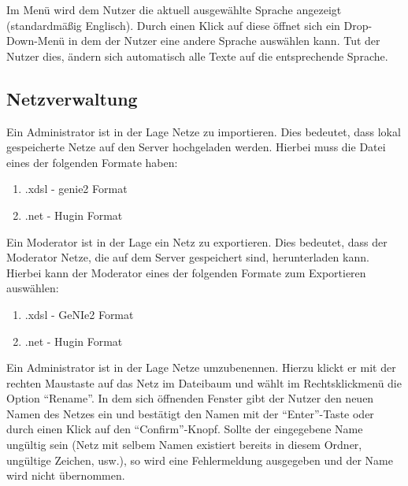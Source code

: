\documentclass[parskip=full,11pt,twoside]{scrartcl}
\begin{document}
Im Menü wird dem Nutzer die aktuell ausgewählte Sprache angezeigt (standardmäßig Englisch). Durch einen Klick auf diese öffnet sich ein Drop-Down-Menü in dem der Nutzer eine andere Sprache auswählen kann. Tut der Nutzer dies, ändern sich automatisch alle Texte auf die entsprechende Sprache.

\subsection{Netzverwaltung}  


Ein Administrator ist in der Lage Netze zu importieren. Dies bedeutet, dass lokal gespeicherte Netze auf den Server hochgeladen werden. Hierbei muss die Datei eines der folgenden Formate haben:
\begin{enumerate}
    \item .xdsl - \gls{genie2} Format
    \item .net - Hugin Format %
    
\end{enumerate}
Ein Moderator ist in der Lage ein Netz zu exportieren. Dies bedeutet, dass der Moderator Netze, die auf dem Server gespeichert sind, herunterladen kann. Hierbei kann der Moderator eines der folgenden Formate zum Exportieren auswählen:
\begin{enumerate}
    \item .xdsl - GeNIe2 Format
    \item .net - Hugin Format %
\end{enumerate}

Ein Administrator ist in der Lage Netze umzubenennen. Hierzu klickt er mit der rechten Maustaste auf das Netz im Dateibaum und wählt im Rechtsklickmenü die Option \enquote{Rename}. In dem sich öffnenden Fenster gibt der Nutzer den neuen Namen des Netzes ein und bestätigt den Namen mit der \enquote{Enter}-Taste oder durch einen Klick auf den \enquote{Confirm}-Knopf. Sollte der eingegebene Name ungültig sein (Netz mit selbem Namen existiert bereits in diesem Ordner, ungültige Zeichen, usw.), so wird eine Fehlermeldung ausgegeben und der Name wird nicht übernommen.

\end{document}
